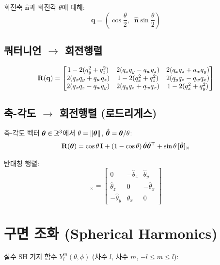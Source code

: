 \documentclass[11pt, a4paper]{report}
\begin{document}
회전축 $\hat{\mathbf{n}}$과 회전각 $\theta$에 대해:
\begin{equation}
\mathbf{q} = \left(\cos\frac{\theta}{2},\;\; \hat{\mathbf{n}} \sin\frac{\theta}{2}\right)
\end{equation}

\subsection{쿼터니언 $\rightarrow$ 회전행렬}

\begin{equation}
\mathbf{R}(\mathbf{q}) = \begin{bmatrix}
1 - 2(q_y^2 + q_z^2) & 2(q_x q_y - q_w q_z) & 2(q_x q_z + q_w q_y) \\
2(q_x q_y + q_w q_z) & 1 - 2(q_x^2 + q_z^2) & 2(q_y q_z - q_w q_x) \\
2(q_x q_z - q_w q_y) & 2(q_y q_z + q_w q_x) & 1 - 2(q_x^2 + q_y^2)
\end{bmatrix}
\end{equation}

\subsection{축-각도 $\rightarrow$ 회전행렬 (로드리게스)}

축-각도 벡터 $\bm{\theta} \in \mathbb{R}^3$에서 $\theta = \|\bm{\theta}\|$, $\hat{\bm{\theta}} = \bm{\theta} / \theta$:
\begin{equation}
\mathbf{R}(\bm{\theta}) = \cos\theta\, \mathbf{I} + (1 - \cos\theta)\, \hat{\bm{\theta}}\hat{\bm{\theta}}^\top + \sin\theta\, [\hat{\bm{\theta}}]_\times
\end{equation}

반대칭 행렬:
\begin{equation}
[\hat{\vtheta}]_\times = \begin{bmatrix}
0 & -\hat{\theta}_z & \hat{\theta}_y \\
\hat{\theta}_z & 0 & -\hat{\theta}_x \\
-\hat{\theta}_y & \hat{\theta}_x & 0
\end{bmatrix}
\end{equation}


\section{구면 조화 (Spherical Harmonics)}
\label{sec:sh_appendix}

실수 SH 기저 함수 $Y_l^m(\theta, \phi)$ (차수 $l$, 차수 $m$, $-l \leq m \leq l$):
\end{document}
